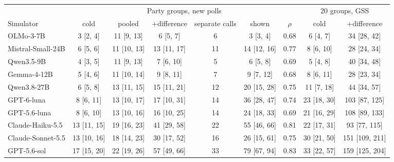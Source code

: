 \begin{table}[h]
\centering\small
\setlength{\tabcolsep}{3.2pt}
\begin{tabular}{lcccccccc}
\toprule
 & \multicolumn{6}{c}{Party groups, new polls} & \multicolumn{2}{c}{20 groups, GSS} \\
\cmidrule(lr){2-7}\cmidrule(lr){8-9}
Simulator & cold & pooled & +difference & separate calls & shown & $\rho$ & cold & +difference \\
\midrule
OLMo-3-7B & 3 {\scriptsize[2, 4]} & 11 {\scriptsize[9, 13]} & 6 {\scriptsize[5, 7]} & 6 & 3 {\scriptsize[3, 4]} & 0.68 & 6 {\scriptsize[4, 7]} & 34 {\scriptsize[28, 42]} \\
Mistral-Small-24B & 6 {\scriptsize[5, 6]} & 11 {\scriptsize[10, 13]} & 13 {\scriptsize[11, 17]} & 11 & 14 {\scriptsize[12, 16]} & 0.77 & 8 {\scriptsize[6, 10]} & 28 {\scriptsize[24, 34]} \\
Qwen3.5-9B & 4 {\scriptsize[3, 5]} & 11 {\scriptsize[9, 13]} & 7 {\scriptsize[6, 10]} & 5 & 6 {\scriptsize[5, 8]} & 0.69 & 5 {\scriptsize[4, 8]} & 40 {\scriptsize[34, 48]} \\
Gemma-4-12B & 5 {\scriptsize[4, 6]} & 11 {\scriptsize[10, 14]} & 9 {\scriptsize[8, 11]} & 7 & 9 {\scriptsize[7, 12]} & 0.68 & 8 {\scriptsize[6, 11]} & 28 {\scriptsize[23, 34]} \\
Qwen3.8-27B & 6 {\scriptsize[5, 8]} & 13 {\scriptsize[11, 15]} & 15 {\scriptsize[11, 21]} & 12 & 20 {\scriptsize[15, 28]} & 0.75 & 11 {\scriptsize[7, 18]} & 44 {\scriptsize[34, 57]} \\
GPT-6-luna & 8 {\scriptsize[6, 11]} & 13 {\scriptsize[10, 17]} & 17 {\scriptsize[10, 31]} & 14 & 36 {\scriptsize[28, 47]} & 0.74 & 23 {\scriptsize[18, 30]} & 103 {\scriptsize[87, 125]} \\
GPT-5.6-luna & 8 {\scriptsize[6, 10]} & 13 {\scriptsize[10, 16]} & 16 {\scriptsize[10, 25]} & 14 & 24 {\scriptsize[18, 33]} & 0.69 & 21 {\scriptsize[16, 29]} & 108 {\scriptsize[89, 133]} \\
Claude-Haiku-5.5 & 13 {\scriptsize[11, 15]} & 19 {\scriptsize[16, 23]} & 41 {\scriptsize[29, 58]} & 22 & 55 {\scriptsize[46, 66]} & 0.81 & 22 {\scriptsize[17, 31]} & 93 {\scriptsize[77, 115]} \\
Claude-Sonnet-5.5 & 13 {\scriptsize[10, 16]} & 18 {\scriptsize[14, 23]} & 30 {\scriptsize[17, 52]} & 16 & 26 {\scriptsize[15, 61]} & 0.75 & 30 {\scriptsize[21, 50]} & 151 {\scriptsize[109, 211]} \\
GPT-5.6-sol & 17 {\scriptsize[15, 20]} & 22 {\scriptsize[19, 26]} & 57 {\scriptsize[49, 66]} & 33 & 79 {\scriptsize[67, 94]} & 0.83 & 33 {\scriptsize[22, 57]} & 159 {\scriptsize[125, 204]} \\

\end{tabular}
\end{table}
